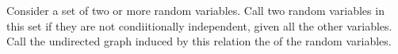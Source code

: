 


Consider a set of two
or more
random variables.
Call two random variables
in this set  if
they are not condiitionally
independent, given all the other
variables.
Call the undirected graph
induced by this relation
the
of the random variables.
